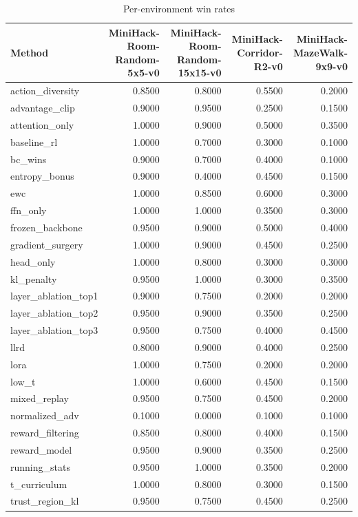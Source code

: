 \begin{table}[htbp]
\centering
\caption{Per-environment win rates}
\label{tab:per-env}
\begin{tabular}{lrrrr}
\toprule
\textbf{Method} & \textbf{MiniHack-Room-Random-5x5-v0} & \textbf{MiniHack-Room-Random-15x15-v0} & \textbf{MiniHack-Corridor-R2-v0} & \textbf{MiniHack-MazeWalk-9x9-v0} \\
\midrule
action\_diversity & 0.8500 & 0.8000 & 0.5500 & 0.2000 \\
advantage\_clip & 0.9000 & 0.9500 & 0.2500 & 0.1500 \\
attention\_only & 1.0000 & 0.9000 & 0.5000 & 0.3500 \\
baseline\_rl & 1.0000 & 0.7000 & 0.3000 & 0.1000 \\
bc\_wins & 0.9000 & 0.7000 & 0.4000 & 0.1000 \\
entropy\_bonus & 0.9000 & 0.4000 & 0.4500 & 0.1500 \\
ewc & 1.0000 & 0.8500 & 0.6000 & 0.3000 \\
ffn\_only & 1.0000 & 1.0000 & 0.3500 & 0.3000 \\
frozen\_backbone & 0.9500 & 0.9000 & 0.5000 & 0.4000 \\
gradient\_surgery & 1.0000 & 0.9000 & 0.4500 & 0.2500 \\
head\_only & 1.0000 & 0.8000 & 0.3000 & 0.3000 \\
kl\_penalty & 0.9500 & 1.0000 & 0.3000 & 0.3500 \\
layer\_ablation\_top1 & 0.9000 & 0.7500 & 0.2000 & 0.2000 \\
layer\_ablation\_top2 & 0.9500 & 0.9000 & 0.3500 & 0.2500 \\
layer\_ablation\_top3 & 0.9500 & 0.7500 & 0.4000 & 0.4500 \\
llrd & 0.8000 & 0.9000 & 0.4000 & 0.2500 \\
lora & 1.0000 & 0.7500 & 0.2000 & 0.2000 \\
low\_t & 1.0000 & 0.6000 & 0.4500 & 0.1500 \\
mixed\_replay & 0.9500 & 0.7500 & 0.4500 & 0.2000 \\
normalized\_adv & 0.1000 & 0.0000 & 0.1000 & 0.1000 \\
reward\_filtering & 0.8500 & 0.8000 & 0.4000 & 0.1500 \\
reward\_model & 0.9500 & 0.9000 & 0.3500 & 0.2500 \\
running\_stats & 0.9500 & 1.0000 & 0.3500 & 0.2000 \\
t\_curriculum & 1.0000 & 0.8000 & 0.3000 & 0.1500 \\
trust\_region\_kl & 0.9500 & 0.7500 & 0.4500 & 0.2500 \\
\bottomrule
\end{tabular}
\end{table}